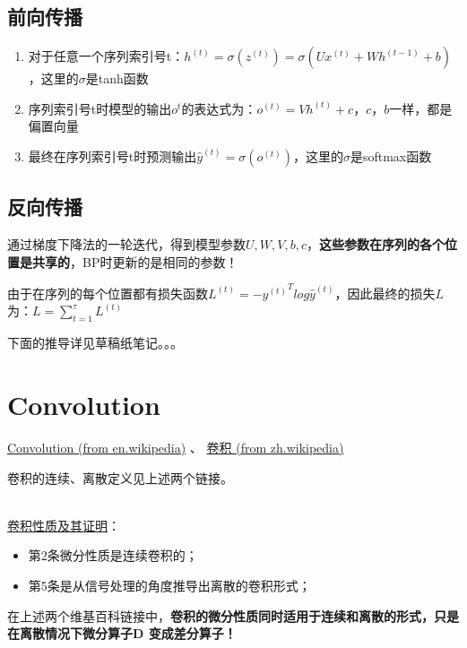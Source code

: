 \documentclass[UTF8]{article}
\begin{document}
    \subsection{前向传播}
    \begin{enumerate}
        \item 对于任意一个序列索引号t：$h^{(t)}=\sigma\left(z^{(t)}\right)=\sigma\left(U x^{(t)}+W h^{(t-1)}+b\right)$，这里的$\sigma$是tanh函数
        \item 序列索引号t时模型的输出$o^{t}$的表达式为：$o^{(t)}=V h^{(t)}+c$，$c，b$一样，都是偏置向量
        \item 最终在序列索引号t时预测输出$\hat{y}^{(t)}=\sigma\left(o^{(t)}\right)$，这里的$\sigma$是softmax函数
    \end{enumerate}

    \subsection{反向传播}
    通过梯度下降法的一轮迭代，得到模型参数$U,W,V,b,c$，\textbf{这些参数在序列的各个位置是共享的}，BP时更新的是相同的参数！

    由于在序列的每个位置都有损失函数$L^{(t)}=-{y^{(t)}}^T log{\hat{y}^{(t)}}$，因此最终的损失$L$为：$L=\sum_{t=1}^{\tau} L^{(t)}$

    下面的推导详见草稿纸笔记。。。

    \section{Convolution}

    \href{https://en.wikipedia.org/wiki/Convolution}{Convolution (from en.wikipedia)}
    、
    \href{https://zh.wikipedia.org/wiki/%E5%8D%B7%E7%A7%AF}{卷积 (from zh.wikipedia)}

    卷积的连续、离散定义见上述两个链接。

\hspace*{\fill} \\
    \href{https://zhuanlan.zhihu.com/p/150737244}{卷积性质及其证明}：
    \begin{itemize}
        \item 第2条微分性质是连续卷积的；
        \item 第5条是从信号处理的角度推导出离散的卷积形式；
    \end{itemize}

    在上述两个维基百科链接中，\textbf{卷积的微分性质同时适用于连续和离散的形式，只是在离散情况下微分算子D
    变成差分算子！}
\end{document}
